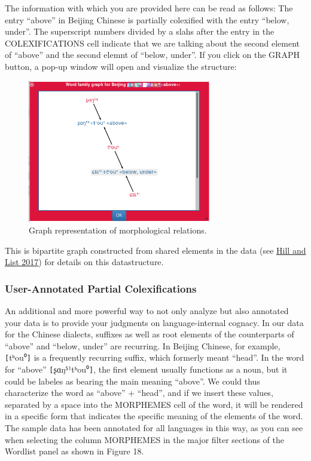 \documentclass[a4paper,svgnames]{scrartcl}
\begin{document}
The information with which you are provided here can be read as follows:
The entry ``above'' in Beijing Chinese is partially colexified with the
entry ``below, under''. The superscript numbers divided by a slahs after
the entry in the COLEXIFICATIONS cell indicate that we are talking about
the second element of ``above'' and the second elemnt of ``below,
under''. If you click on the GRAPH button, a pop-up window will open and
visualize the structure:

\begin{figure}
\centering
\includegraphics[width=8cm]{images/figure-17.png}
\caption{Graph representation of morphological relations.}
\end{figure}

This is bipartite graph constructed from shared elements in the data
(see \href{http://bibliography.lingpy.org?key=Hill2017a}{Hill and List
2017}) for details on this datastructure.

\subsubsection{User-Annotated Partial
Colexifications}\label{user-annotated-partial-colexifications}

An additional and more powerful way to not only analyze but also
annotated your data is to provide your judgments on language-internal
cognacy. In our data for the Chinese dialects, suffixes as well as root
elements of the counterparts of ``above'' and ``below, under'' are
recurring. In Beijing Chinese, for example,
\texttt{{[}}tʰou⁰\texttt{{]}} is a frequently recurring suffix, which
formerly meant ``head''. In the word for ``above''
\texttt{{[}}ʂɑŋ⁵¹tʰou⁰\texttt{{]}}, the first element usually functions
as a noun, but it could be labeles as bearing the main meaning
``above''. We could thus characterize the word as ``above'' + ``head'',
and if we insert these values, separated by a space into the MORPHEMES
cell of the word, it will be rendered in a specific form that indicates
the specific meaning of the elements of the word. The sample data has
been annotated for all languages in this way, as you can see when
selecting the column MORPHEMES in the major filter sections of the
Wordlist panel as shown in Figure 18.
\end{document}
